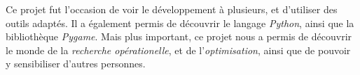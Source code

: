 Ce projet fut l'occasion de voir  %
le développement à plusieurs, et d'utiliser
des outils adaptés.
Il a également permis de découvrir le langage
\emph{Python}, ainsi que la bibliothèque \emph{Pygame}.
Mais plus important, ce projet nous a permis
de découvrir le monde de la \emph{recherche opérationelle},
et de l'\emph{optimisation}, ainsi que de pouvoir y sensibiliser
d'autres personnes.
